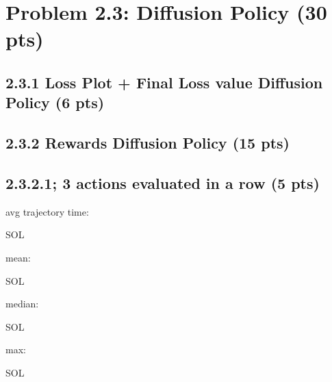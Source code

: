 \documentclass[12pt]{article}
\begin{document}
\newpage
\section*{Problem 2.3: Diffusion Policy (30 pts)}

\subsection*{2.3.1 Loss Plot + Final Loss value Diffusion Policy (6 pts)}
\begin{tcolorbox}[fit,height=30em, width=40em, blank, borderline={1pt}{1pt},nobeforeafter]
            \begin{solution}

            \end{solution}
            
            \end{tcolorbox}


\subsection*{2.3.2 Rewards Diffusion Policy (15 pts)}
\subsection*{2.3.2.1; 3 actions evaluated in a row (5 pts)}

avg trajectory time: \begin{tcolorbox}[fit,height=1cm, width=2cm, blank, borderline={1pt}{1pt},nobeforeafter]
    \begin{center}
    \vspace{3mm}
    \large{SOL}
    \end{center}
\end{tcolorbox}
mean: \begin{tcolorbox}[fit,height=1cm, width=2cm, blank, borderline={1pt}{1pt},nobeforeafter]
    \begin{center}
    \vspace{3mm}
    \large{SOL}
    \end{center}
\end{tcolorbox}
median: \begin{tcolorbox}[fit,height=1cm, width=2cm, blank, borderline={1pt}{1pt},nobeforeafter]
    \begin{center}
    \vspace{3mm}
    \large{SOL}
    \end{center}
\end{tcolorbox}
max: \begin{tcolorbox}[fit,height=1cm, width=2cm, blank, borderline={1pt}{1pt},nobeforeafter]
    \begin{center}
    \vspace{3mm}
    \large{SOL}
    \end{center}
\end{tcolorbox}
    \\
\end{document}

